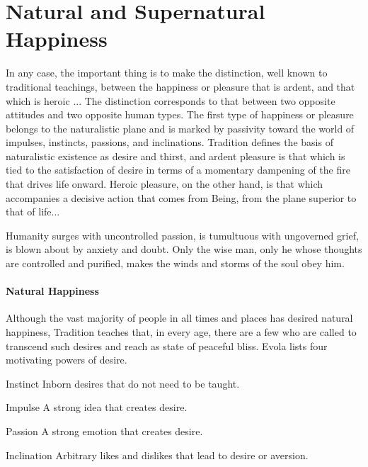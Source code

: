 \section{Natural and Supernatural Happiness}

\begin{quotex}
In any case, the important thing is to make the distinction, well known to traditional teachings, between the happiness or pleasure that is ardent, and that which is heroic ... The distinction corresponds to that between two opposite attitudes and two opposite human types. The first type of happiness or pleasure belongs to the naturalistic plane and is marked by passivity toward the world of impulses, instincts, passions, and inclinations. Tradition defines the basis of naturalistic existence as desire and thirst, and ardent pleasure is that which is tied to the satisfaction of desire in terms of a momentary dampening of the fire that drives life onward. Heroic pleasure, on the other hand, is that which accompanies a decisive action that comes from Being, from the plane superior to that of life... 
\end{quotex}


\begin{quotex}
Humanity surges with uncontrolled passion, is tumultuous with ungoverned grief, is blown about by anxiety and doubt. Only the wise man, only he whose thoughts are controlled and purified, makes the winds and storms of the soul obey him.
\end{quotex}


\paragraph{Natural Happiness}


Although the vast majority of people in all times and places has desired natural happiness, Tradition teaches that, in every age, there are a few who are called to transcend such desires and reach as state of peaceful bliss. Evola lists four motivating powers of desire.

\begin{description}
\item{Instinct} Inborn desires that do not need to be taught.

\item{Impulse} A strong idea that creates desire. 

\item{Passion} A strong emotion that creates desire. 

\item{Inclination} Arbitrary likes and dislikes that lead to desire or aversion.
\end{description}


